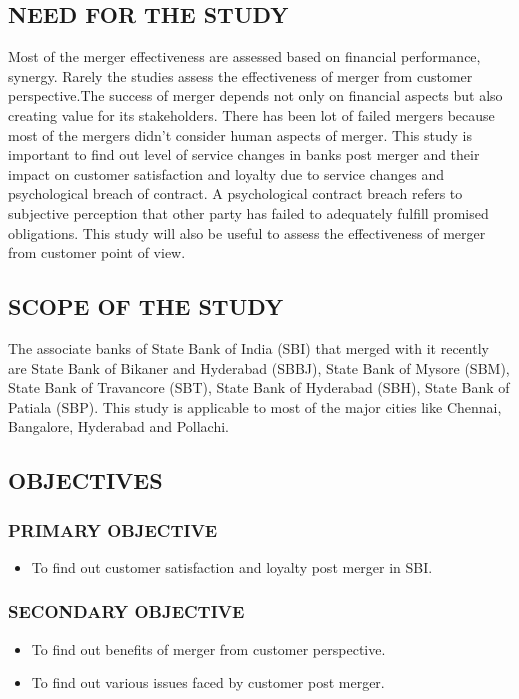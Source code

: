 \documentclass[a4paper, 12pt]{extarticle}
\begin{document}
{\subsection{NEED FOR THE STUDY}
\par Most of the merger effectiveness are assessed based on financial performance, synergy. Rarely the studies assess the effectiveness of merger from customer perspective.The success of merger depends not only on financial aspects but also creating value for its stakeholders. There has been lot of failed mergers because most of the mergers didn't consider human aspects of merger. This study is important to find out level of service changes in banks post merger and their impact on customer satisfaction and loyalty due to service changes and psychological breach of contract. A psychological contract breach refers to subjective perception that other party has failed to adequately fulfill promised obligations. This study will also be useful to assess the effectiveness of merger from customer point of view.

\subsection{SCOPE OF THE STUDY}
The associate banks of State Bank of India (SBI) that merged with it recently are State Bank of Bikaner and Hyderabad (SBBJ), State Bank of Mysore (SBM), State Bank of Travancore (SBT), State Bank of Hyderabad (SBH), State Bank of Patiala (SBP). This study is applicable to most of the major cities like Chennai, Bangalore, Hyderabad and Pollachi.

\subsection{OBJECTIVES}
\subsubsection{PRIMARY OBJECTIVE}
\begin{itemize}
\item To find out customer satisfaction and loyalty post merger in SBI.
\end{itemize}
\subsubsection{SECONDARY OBJECTIVE}
\begin{itemize}
\item To find out benefits of merger from customer perspective.
\item To find out various issues faced by customer post merger.
\end{itemize}

}
\end{document}
